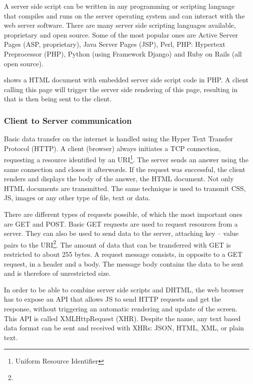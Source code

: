A server side script can be written in any programming or scripting language that compiles and runs on the server operating system and can interact with the web server software.
There are many server side scripting languages available, proprietary and open source.
Some of the most popular ones are Active Server Pages (ASP, proprietary), Java Server Pages (JSP), Perl, PHP: Hypertext Preprocessor (PHP), Python (using Framework Django) and Ruby on Rails (all open source).

 shows a HTML document with embedded server side script code in PHP.
A client calling this page will trigger the server side rendering of this page, resulting in  that is then being sent to the client.



\subsubsection{Client to Server communication}
\label{sec:servercom}

Basic data transfer on the internet is handled using the Hyper Text Transfer Protocol (HTTP).
A client (browser) always initiates a TCP connection, requesting a resource identified by an URI\footnote{Uniform Resource Identifier}.
The server sends an answer using the same connection and closes it afterwords.
If the request was successful, the client renders and displays the body of the answer, the HTML document. Not only HTML documents are transmitted. The same technique is used to transmit CSS, JS, images or any other type of file, text or data.

There are different types of requests possible, of which the most important ones are GET and POST.
Basic GET requests are used to request resources from a server.
They can also be used to send data to the server, attaching key -- value pairs to the URI\footnote{}. The amount of data that can be transferred with GET is restricted to about 255 bytes.
A  request message consists, in opposite to a GET request, in a header and a body.
The message body contains the data to be sent and is therefore of unrestricted size.

In order to be able to combine server side scripts and DHTML, the web browser has to expose an API that allows JS to send HTTP requests and get the response, without triggering an automatic rendering and update of the screen.
This API is called XMLHttpRequest (XHR). Despite the name, any text based data format can be sent and received with XHRs: JSON, HTML, XML, or plain text.


